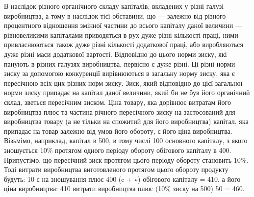 В наслідок різного органічного складу капіталів, вкладених
у різні галузі виробництва, а тому в наслідок тієї обставини,
що — залежно від різного процентного відношення змінної частини до всього капіталу даної величини —
рівновеликими капіталами приводяться в рух дуже різні кількості праці, ними привласнюються також
дуже різні кількості додаткової праці, або
виробляються дуже різні маси додаткової вартості. Відповідно
до цього норми зиску, які панують в різних галузях виробництва,
первісно є дуже різні. Ці різні норми зиску за допомогою конкуренції вирівнюються в загальну
норму зиску, яка
є пересічною всіх цих різних норм зиску. Зиск, який відповідно
до цієї загальної норми зиску припадає на капітал даної величини, який би не був його органічний
склад, зветься пересічним
зиском. Ціна товару, яка дорівнює витратам його виробництва
плюс та частина річного пересічного зиску на застосований для
виробництва товару (а не тільки на спожитий для його виробництва) капітал, яка припадає на товар
залежно від умов його
обороту, є його ціна виробництва. Візьмімо, наприклад, капітал
в 500, в тому числі 100 основного капіталу, з якого зношується
10\% протягом одного періоду обороту обігового капіталу в 400.
Припустімо, що пересічний зиск протягом цього періоду обороту становить 10\%. Тоді витрати
виробництва виготовленого
протягом цього обороту продукту будуть: 10 с на зношування
плюс 400 (c + v) обігового капіталу = 410, а його ціна виробництва: 410 витрати виробництва плюс
(10\% зиску на 500) 50 = 460.

